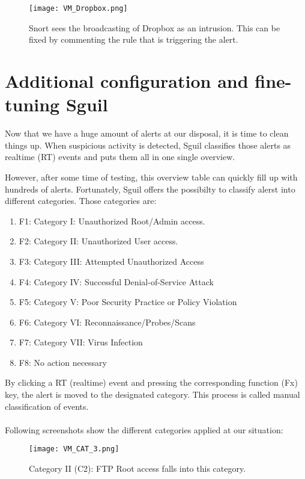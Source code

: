 \begin{figure}[h]
    \centering
    \texttt{[image: VM\_Dropbox.png]}
    \caption{Snort sees the broadcasting of Dropbox as an intrusion. This can be fixed by commenting the rule that is triggering the alert.}
\end{figure}

\clearpage

\section{Additional configuration and fine-tuning Sguil}

Now that we have a huge amount of alerts at our disposal, it is time to clean things up. When suspicious activity is detected, Sguil classifies those alerts as realtime (RT) events and puts them all in one single overview.

However, after some time of testing, this overview table can quickly fill up with hundreds of alerts. Fortunately, Sguil offers the possibilty to classify alerst into different categories. Those categories are:
\begin{enumerate}
\item F1: Category I: Unauthorized Root/Admin access.
\item F2: Category II: Unauthorized User access.
\item F3: Category III: Attempted Unauthorized Access
\item F4: Category IV: Successful Denial-of-Service Attack
\item F5: Category V: Poor Security Practice or Policy Violation
\item F6: Category VI: Reconnaissance/Probes/Scans
\item F7: Category VII: Virus Infection
\item F8: No action necessary
\end{enumerate}

By clicking a RT (realtime) event and pressing the corresponding function (Fx) key, the alert is moved to the designated category. This process is called manual classification of events. \\ \\
Following screenshots show the different categories applied at our situation:

\begin{figure}[h]
    \centering
    \texttt{[image: VM\_CAT\_3.png]}
    \caption{Category II (C2): FTP Root access falls into this category.}
\end{figure}

